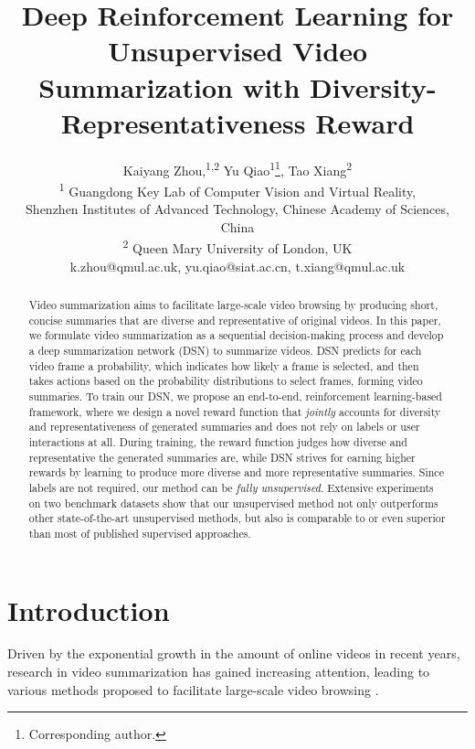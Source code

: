 \documentclass[letterpaper]{article} \usepackage{aaai18}  \usepackage{times}  \usepackage{helvet}  \usepackage{courier}  \usepackage{url}  \usepackage{graphicx}
\begin{document}
\title{Deep Reinforcement Learning for Unsupervised Video Summarization with Diversity-Representativeness Reward}
\author{Kaiyang Zhou,\textsuperscript{1,2} Yu Qiao\textsuperscript{1}\thanks{Corresponding author.}, Tao Xiang\textsuperscript{2} \\
\textsuperscript{1} Guangdong Key Lab of Computer Vision and Virtual Reality, \\ 
Shenzhen Institutes of Advanced Technology, Chinese Academy of Sciences, China \\
\textsuperscript{2} Queen Mary University of London, UK \\
k.zhou@qmul.ac.uk, yu.qiao@siat.ac.cn, t.xiang@qmul.ac.uk \\
}
\maketitle

\begin{abstract}
Video summarization aims to facilitate large-scale video browsing by producing short, concise summaries that are diverse and representative of original videos. In this paper, we formulate video summarization as a sequential decision-making process and develop a deep summarization network (DSN) to summarize videos. DSN predicts for each video frame a probability, which indicates how likely a frame is selected, and then takes actions based on the probability distributions to select frames, forming video summaries. To train our DSN, we propose an end-to-end, reinforcement learning-based framework, where we design a novel reward function that \emph{jointly} accounts for diversity and representativeness of generated summaries and does not rely on labels or user interactions at all. During training, the reward function judges how diverse and representative the generated summaries are, while DSN strives for earning higher rewards by learning to produce more diverse and more representative summaries. Since labels are not required, our method can be \emph{fully unsupervised}. Extensive experiments on two benchmark datasets show that our unsupervised method not only outperforms other state-of-the-art unsupervised methods, but also is comparable to or even superior than most of published supervised approaches.
\end{abstract}

\section{Introduction}
Driven by the exponential growth in the amount of online videos in recent years, research in video summarization has gained increasing attention, leading to various methods proposed to facilitate large-scale video browsing \cite{gygli2014creating,gygli2015video,zhang2016summary,song2015tvsum,panda2017collaborative,mahasseniunsupervised,potapov2014category}.
\end{document}
